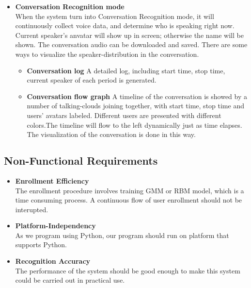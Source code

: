 \begin{itemize}
		\item \textbf{Conversation Recognition mode} \\
			When the system turn into Conversation Recognition mode,
			it will continuously collect voice data, and determine
			who is speaking right now. Current speaker's anvatar will show up
			in screen; otherwise the name will be shown. The conversation
			audio can be downloaded and saved.
			There are some ways to visualize the speaker-distribution in the
			conversation.
			\begin{itemize}
				\item \textbf{Conversation log}
					A detailed log, including start time, stop time,
					current speaker of each period is generated.
				\item \textbf{Conversation flow graph}
					A timeline of the conversation is showed by a number of
					talking-clouds joining together, with start time, stop time
					and users' avatars labeled. Different users are presented
					with different colors.The timeline will flow to the left dynamically
					just as time elapses. The visualization of the conversation is done
					in this way.
			\end{itemize}

	\end{itemize}

\subsection{Non-Functional Requirements}
	\begin{itemize}
		\item \textbf{Enrollment Efficiency} \\
			The enrollment procedure involves training GMM or RBM model, which
			is a time consuming process. A continuous flow of user enrollment
			should not be interupted.
		\item \textbf{Platform-Independency} \\
			As we program using Python, our program should run on
			platform that supports Python.
		\item \textbf{Recognition Accuracy} \\
			The performance of the system should be good enough to
			make this system could be carried out in practical use.
	\end{itemize}
